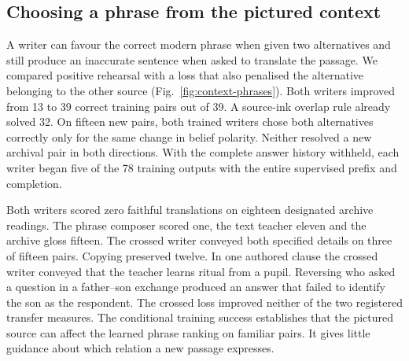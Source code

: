 \subsection*{Choosing a phrase from the pictured context}
A writer can favour the correct modern phrase when given two alternatives and still produce an inaccurate sentence when asked to translate the passage. We compared positive rehearsal with a loss that also penalised the alternative belonging to the other source (Fig.~\ref{fig:context-phrases}). Both writers improved from 13 to 39 correct training pairs out of 39. A source-ink overlap rule already solved 32. On fifteen new pairs, both trained writers chose both alternatives correctly only for the same change in belief polarity. Neither resolved a new archival pair in both directions. With the complete answer history withheld, each writer began five of the 78 training outputs with the entire supervised prefix and completion.

Both writers scored zero faithful translations on eighteen designated archive readings. The phrase composer scored one, the text teacher eleven and the archive gloss fifteen. The crossed writer conveyed both specified details on three of fifteen pairs. Copying preserved twelve. In one authored clause the crossed writer conveyed that the teacher learns ritual from a pupil. Reversing who asked a question in a father--son exchange produced an answer that failed to identify the son as the respondent. The crossed loss improved neither of the two registered transfer measures. The conditional training success establishes that the pictured source can affect the learned phrase ranking on familiar pairs. It gives little guidance about which relation a new passage expresses.
